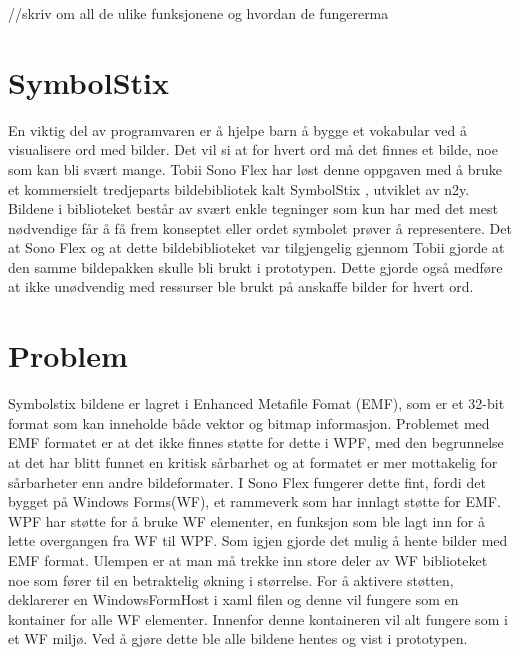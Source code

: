 { 
 //skriv om all de ulike funksjonene og hvordan de fungererma
 
 
 
 
 
 
 
 
 
 
 
 
 
 
 
 
 
 
 
 
 
 
 
 
\section{SymbolStix} 
 
 
En viktig del av programvaren er å hjelpe barn å bygge et vokabular ved å visualisere ord med bilder. Det vil si at for hvert ord må det finnes et bilde, noe som kan bli svært mange. Tobii Sono Flex har løst denne oppgaven med å bruke et kommersielt tredjeparts bildebibliotek kalt SymbolStix \cite{n2y}, utviklet av n2y. Bildene i biblioteket består av svært enkle tegninger som kun har med det mest nødvendige får å få frem konseptet eller ordet symbolet prøver å representere. Det at Sono Flex og at dette bildebiblioteket var tilgjengelig gjennom Tobii gjorde at den samme bildepakken skulle bli brukt i prototypen. Dette gjorde også medføre at ikke unødvendig med ressurser ble brukt på anskaffe bilder for hvert ord. 
 
 
 
 
\section{Problem} 
 
 
Symbolstix bildene er lagret i Enhanced Metafile Fomat (EMF), som er et 32-bit format som kan inneholde både vektor og bitmap informasjon\cite{AboutEMF}. Problemet med EMF formatet er at det ikke finnes støtte for dette i WPF, med den begrunnelse at det har blitt funnet en kritisk sårbarhet\cite{EMFVulnerability} og at formatet er mer mottakelig for sårbarheter\cite{EMFForum} enn andre bildeformater. I Sono Flex fungerer dette fint, fordi det bygget på Windows Forms(WF),  et rammeverk som har innlagt støtte for EMF. WPF har støtte for å bruke WF elementer,  en funksjon som ble lagt inn for å lette overgangen fra WF til WPF. Som igjen gjorde det mulig å hente bilder med EMF format. Ulempen er at man må trekke inn store deler av WF biblioteket noe som fører til en betraktelig økning i størrelse. For å aktivere støtten, deklarerer en WindowsFormHost i xaml filen og denne vil fungere som en kontainer for alle WF elementer. Innenfor denne kontaineren vil alt fungere som i et WF miljø. Ved å gjøre dette ble alle bildene hentes og vist i prototypen.  
 
}
